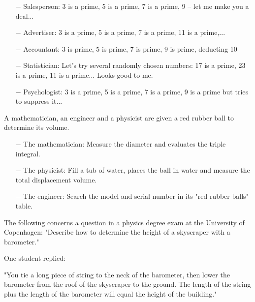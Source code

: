 \begin{itemize}
	\item[$-$] Salesperson: 3 is a prime, 5 is a prime, 7 is a prime, 9 -- let me make you a deal...

	\item[$-$] Advertiser: 3 is a prime, 5 is a prime, 7 is a prime, 11 is a prime,...

	\item[$-$] Accountant: 3 is prime, 5 is prime, 7 is prime, 9 is prime, deducting 10%

	\item[$-$] Statistician: Let's try several randomly chosen numbers: 17 is a prime, 23 is a prime, 11 is a prime... Looks good to me.

	\item[$-$] Psychologist: 3 is a prime, 5 is a prime, 7 is a prime, 9 is a prime but tries to suppress it... 
\end{itemize}
	\begin{center}\underline{\hspace{5 cm}}\end{center}
	
A mathematician, an engineer and a physicist are given a red rubber ball to determine its volume.

\begin{itemize}	 
	\item[$-$] The mathematician: Measure the diameter and evaluates the triple integral.

	\item[$-$] The physicist: Fill a tub of water, places the ball in water and measure the total displacement volume.

	\item[$-$] The engineer: Search the model and serial number in its "red rubber balls" table.
\end{itemize}		
	\begin{center}\underline{\hspace{5 cm}}\end{center}

The following concerns a question in a physics degree exam at the University of Copenhagen: "Describe how to determine the height of a skyscraper with a barometer." 

One student replied: 

"You tie a long piece of string to the neck of the barometer, then lower the barometer from the roof of the skyscraper to the ground. The length of the string plus the length of the barometer will equal the height of the building." 

